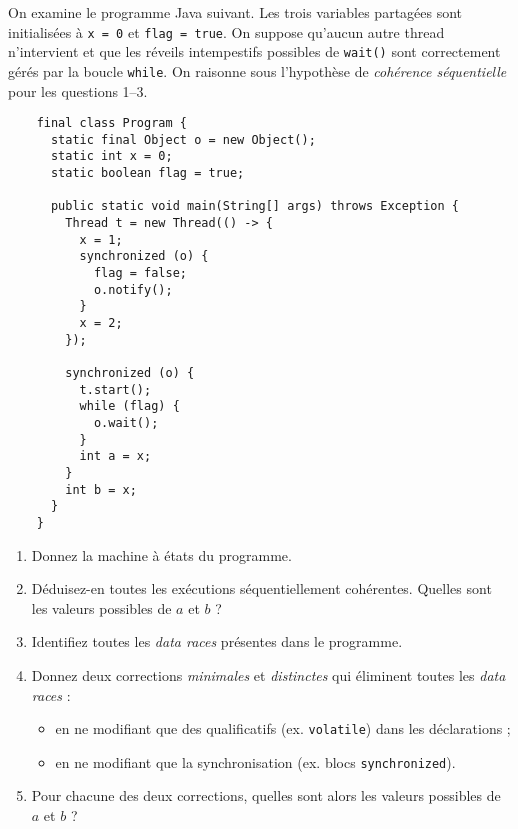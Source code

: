
\begingroup

\begin{exercice}
  \label{exo:memory/dataraces}

  On examine le programme Java suivant. Les trois variables partagées sont initialisées à \lstinline{x = 0} et \lstinline{flag = true}.
  On suppose qu'aucun autre thread n'intervient et que les réveils intempestifs possibles de \lstinline{wait()} sont correctement
  gérés par la boucle \lstinline{while}. On raisonne sous l'hypothèse de \emph{cohérence séquentielle} pour les questions 1–3.

  \begin{lstlisting}
    final class Program {
      static final Object o = new Object();
      static int x = 0;
      static boolean flag = true;

      public static void main(String[] args) throws Exception {
        Thread t = new Thread(() -> {
          x = 1;                 
          synchronized (o) {     
            flag = false;        
            o.notify();          
          }                      
          x = 2;                 
        });

        synchronized (o) {       
          t.start();             
          while (flag) {         
            o.wait();            
          }
          int a = x;             
        }                        
        int b = x;               
      }
    }
  \end{lstlisting}

  \begin{enumerate}
  \item Donnez la machine à états du programme.
  \item Déduisez-en toutes les exécutions séquentiellement cohérentes. Quelles sont les valeurs possibles de $a$ et $b$ ?
  \item Identifiez toutes les \emph{data races} présentes dans le programme.
  \item Donnez deux corrections \emph{minimales} et \emph{distinctes} qui éliminent toutes les \emph{data races} :
    \begin{itemize}
    \item en ne modifiant que des qualificatifs (ex. \lstinline{volatile}) dans les déclarations ;
    \item en ne modifiant que la synchronisation (ex. blocs \lstinline{synchronized}).
    \end{itemize}
  \item Pour chacune des deux corrections, quelles sont alors les valeurs possibles de $a$ et $b$ ?
  \end{enumerate}

\end{exercice}

\endgroup
\endinput
